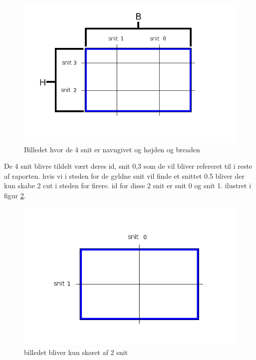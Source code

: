 \begin{figure}[h]
	\begin{center}
		\includegraphics[scale=0.42,angle=0]{afsnit/vores_implementation/billeder/naiv_algoritme/Cut}
	\end{center}
	\caption[]{Billedet hvor de 4 snit er navngivet og højden og breaden}
	\label{cut}
\end{figure}

De 4 snit blivre tildelt vært deres id, snit 0,3 som de vil bliver
refereret til i reste af raporten. hvis vi i steden for de gyldne snit
vil finde et snittet 0.5 bliver der kun skabe 2 cut i steden for firere.
id for disse 2 snit er snit 0 og snit 1. ilustret i figur \ref{2Cut}.

\begin{figure}[h]
	\begin{center}
		\includegraphics[scale=0.42,angle=0]{afsnit/vores_implementation/billeder/naiv_algoritme/2Cut}
	\end{center}
	\caption[]{billedet bliver kun skøret af 2 snit}
	\label{2Cut}
\end{figure}

